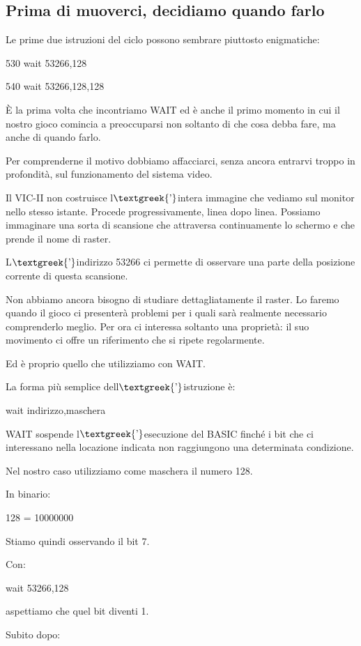 \documentclass{article}
\begin{document}
\subsection{Prima di muoverci, decidiamo quando farlo}
Le prime due istruzioni del ciclo possono sembrare piuttosto enigmatiche:

530 wait 53266,128

540 wait 53266,128,128

È la prima volta che incontriamo WAIT ed è anche il primo momento in cui il nostro gioco comincia a preoccuparsi non
soltanto di che cosa debba fare, ma anche di quando farlo.

Per comprenderne il motivo dobbiamo affacciarci, senza ancora entrarvi troppo in profondità, sul funzionamento del
sistema video.

Il VIC-II non costruisce l$\text{\textgreek{’}}$intera immagine che vediamo sul monitor nello stesso istante. Procede
progressivamente, linea dopo linea. Possiamo immaginare una sorta di scansione che attraversa continuamente lo schermo
e che prende il nome di raster.

L$\text{\textgreek{’}}$indirizzo 53266 ci permette di osservare una parte della posizione corrente di questa scansione.

Non abbiamo ancora bisogno di studiare dettagliatamente il raster. Lo faremo quando il gioco ci presenterà problemi per
i quali sarà realmente necessario comprenderlo meglio. Per ora ci interessa soltanto una proprietà: il suo movimento ci
offre un riferimento che si ripete regolarmente.

Ed è proprio quello che utilizziamo con WAIT.

La forma più semplice dell$\text{\textgreek{’}}$istruzione è:

wait indirizzo,maschera

WAIT sospende l$\text{\textgreek{’}}$esecuzione del BASIC finché i bit che ci interessano nella locazione indicata non
raggiungono una determinata condizione.

Nel nostro caso utilizziamo come maschera il numero 128.

In binario:

128 = 10000000

Stiamo quindi osservando il bit 7.

Con:

wait 53266,128

aspettiamo che quel bit diventi 1.

Subito dopo:
\end{document}
